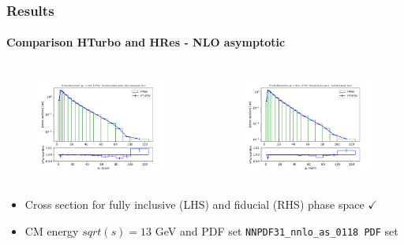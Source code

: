 \documentclass[aspectratio=43]{beamer}
\begin{document}
\begin{frame}
	
	\frametitle{Results}
	\framesubtitle{Comparison HTurbo and HRes - NLO asymptotic}

	\footnotesize
	
	\begin{columns}
		
		
		\begin{figure}
			\includegraphics[width = 7cm]{plots/part3/chapter6/nnlo-ct-1.png}
		\end{figure}
		
		
		\begin{figure}
			\includegraphics[width = 7cm]{plots/part3/chapter6/nnlo-ct-fid-1.png}
		\end{figure}
		
	\end{columns}
	
	\begin{itemize}
		\item Cross section for fully inclusive (LHS) and fiducial (RHS) phase space {\color{darkgreen}$\checkmark$} 
		\item CM energy $sqrt(s) = 13$ GeV and PDF set \texttt{NNPDF31\_nnlo\_as\_0118 PDF} set
	\end{itemize}

\end{frame}
\end{document}
